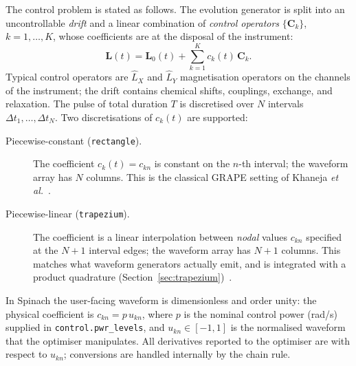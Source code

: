 \documentclass[11pt,a4paper]{article}
\newcommand{\code}[1]{\texttt{#1}}
\newcommand{\op}[1]{\hat{#1}}
\begin{document}
The control problem is stated as follows. The evolution generator is split
into an uncontrollable \emph{drift} and a linear combination of
\emph{control operators} $\{\mathbf{C}_k\}$, $k=1,\ldots,K$, whose
coefficients are at the disposal of the instrument:
\begin{equation}
  \mathbf{L}(t)=\mathbf{L}_0(t)+\sum_{k=1}^{K}c_k(t)\,\mathbf{C}_k.
  \label{eq:splitting}
\end{equation}
Typical control operators are $\op{L}_X$ and $\op{L}_Y$ magnetisation
operators on the channels of the instrument; the drift contains chemical
shifts, couplings, exchange, and relaxation. The pulse of total duration
$T$ is discretised over $N$ intervals $\Delta t_1,\ldots,\Delta t_N$. Two
discretisations of $c_k(t)$ are supported:
\begin{description}
  \item[Piecewise-constant (\code{rectangle}).] The coefficient
  $c_k(t)=c_{kn}$ is constant on the $n$-th interval; the waveform array
  has $N$ columns. This is the classical GRAPE setting of Khaneja \emph{et
  al.}~\cite{khaneja2005}.
  \item[Piecewise-linear (\code{trapezium}).] The coefficient is a linear
  interpolation between \emph{nodal} values $c_{kn}$ specified at the
  $N{+}1$ interval edges; the waveform array has $N{+}1$ columns. This
  matches what waveform generators actually emit, and is integrated with a
  product quadrature (Section~\ref{sec:trapezium})~\cite{rasulov2023}.
\end{description}
In Spinach the user-facing waveform is dimensionless and order unity: the
physical coefficient is $c_{kn}=p\,u_{kn}$, where $p$ is the nominal
control power (rad/s) supplied in \code{control.pwr\_levels}, and
$u_{kn}\in[-1,1]$ is the normalised waveform that the optimiser
manipulates. All derivatives reported to the optimiser are with respect to
$u_{kn}$; conversions are handled internally by the chain rule.
\end{document}
